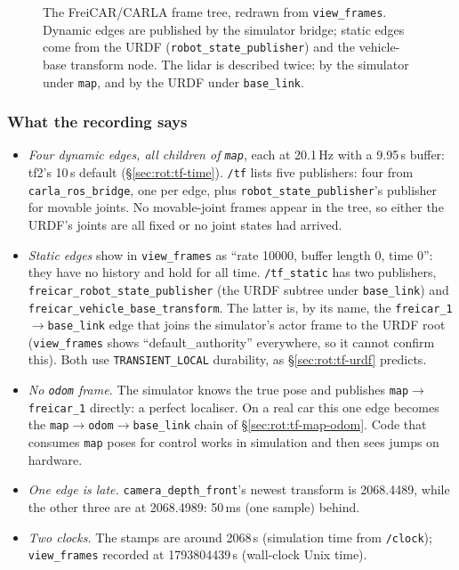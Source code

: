 \begin{figure}[h]
\begin{tikzpicture}
\end{tikzpicture}
\caption{The FreiCAR/CARLA frame tree, redrawn from \texttt{view\_frames}. Dynamic edges are published by the simulator bridge; static edges come from the URDF (\texttt{robot\_state\_publisher}) and the vehicle-base transform node. The lidar is described twice: by the simulator under \texttt{map}, and by the URDF under \texttt{base\_link}.}
\label{fig:rot:freicar-tree}
\end{figure}

\subsubsection{What the recording says}
\begin{itemize}
\item \emph{Four dynamic edges, all children of \texttt{map}}, each at 20.1\,Hz with a 9.95\,s buffer: tf2's 10\,s default (\S\ref{sec:rot:tf-time}). \texttt{/tf} lists five publishers: four from \texttt{carla\_ros\_bridge}, one per edge, plus \texttt{robot\_state\_publisher}'s publisher for movable joints. No movable-joint frames appear in the tree, so either the URDF's joints are all fixed or no joint states had arrived.
\item \emph{Static edges} show in \texttt{view\_frames} as ``rate 10000, buffer length 0, time 0'': they have no history and hold for all time. \texttt{/tf\_static} has two publishers, \texttt{freicar\_robot\_state\_publisher} (the URDF subtree under \texttt{base\_link}) and \texttt{freicar\_vehicle\_base\_transform}. The latter is, by its name, the \texttt{freicar\_1}$\to$\texttt{base\_link} edge that joins the simulator's actor frame to the URDF root (\texttt{view\_frames} shows ``default\_authority'' everywhere, so it cannot confirm this). Both use \texttt{TRANSIENT\_LOCAL} durability, as \S\ref{sec:rot:tf-urdf} predicts.
\item \emph{No \texttt{odom} frame.} The simulator knows the true pose and publishes \texttt{map}$\to$\texttt{freicar\_1} directly: a perfect localiser. On a real car this one edge becomes the \texttt{map}$\to$\texttt{odom}$\to$\texttt{base\_link} chain of \S\ref{sec:rot:tf-map-odom}. Code that consumes \texttt{map} poses for control works in simulation and then sees jumps on hardware.
\item \emph{One edge is late.} \texttt{camera\_depth\_front}'s newest transform is 2068.4489, while the other three are at 2068.4989: 50\,ms (one sample) behind.
\item \emph{Two clocks.} The stamps are around 2068\,s (simulation time from \texttt{/clock}); \texttt{view\_frames} recorded at 1793804439\,s (wall-clock Unix time).
\end{itemize}

